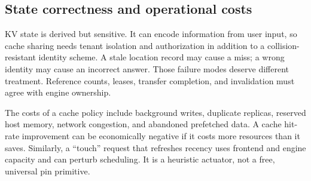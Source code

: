 \subsection{State correctness and operational costs}
KV state is derived but sensitive. It can encode information from user input,
so cache sharing needs tenant isolation and authorization in addition to a
collision-resistant identity scheme. A stale location record may cause a miss;
a wrong identity may cause an incorrect answer. Those failure modes deserve
different treatment. Reference counts, leases, transfer completion, and
invalidation must agree with engine ownership.

The costs of a cache policy include background writes, duplicate replicas,
reserved host memory, network congestion, and abandoned prefetched data. A
cache hit-rate improvement can be economically negative if it costs more
resources than it saves. Similarly, a ``touch'' request that refreshes recency
uses frontend and engine capacity and can perturb scheduling. It is a heuristic
actuator, not a free, universal pin primitive.

